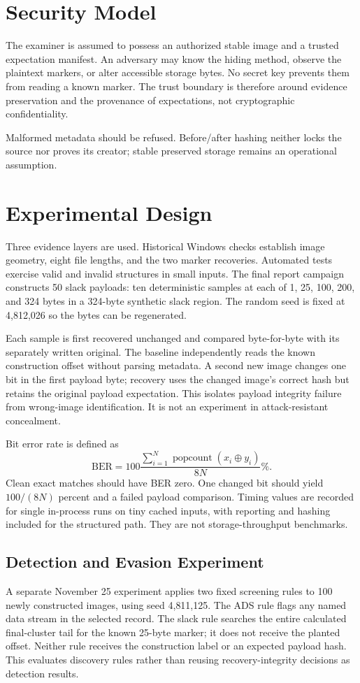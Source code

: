 \section{Security Model}
The examiner is assumed to possess an authorized stable image and a trusted
expectation manifest. An adversary may know the hiding method, observe the
plaintext markers, or alter accessible storage bytes. No secret key prevents
them from reading a known marker. The trust boundary is therefore around
evidence preservation and the provenance of expectations, not cryptographic
confidentiality.

Malformed metadata should be refused. Before/after hashing neither locks
the source nor proves its creator; stable preserved storage remains an
operational assumption.

\section{Experimental Design}
Three evidence layers are used. Historical Windows checks establish image
geometry, eight file lengths, and the two marker recoveries. Automated tests
exercise valid and invalid structures in small inputs. The final report
campaign constructs 50 slack payloads: ten deterministic samples at each
of 1, 25, 100, 200, and 324 bytes in a 324-byte synthetic slack region.
The random seed is fixed at 4,812,026 so the bytes can be regenerated.

Each sample is first recovered unchanged and compared byte-for-byte with
its separately written original. The baseline independently reads the known
construction offset without parsing metadata. A second new image changes
one bit in the first payload byte; recovery uses the changed image's correct
hash but retains the original payload expectation. This isolates payload
integrity failure from wrong-image identification. It is not an experiment
in attack-resistant concealment.

Bit error rate is defined as
\begin{equation}
\mathrm{BER}=100\frac{\sum_{i=1}^{N}\operatorname{popcount}(x_i\oplus y_i)}{8N}\%.
\end{equation}
Clean exact matches should have BER zero. One changed bit should yield
$100/(8N)$ percent and a failed payload comparison. Timing values are
recorded for single in-process runs on tiny cached inputs, with reporting
and hashing included for the structured path. They are not storage-throughput
benchmarks.

\subsection{Detection and Evasion Experiment}
A separate November 25 experiment applies two fixed screening rules to
100 newly constructed images, using seed 4,811,125. The ADS rule flags any
named data stream in the selected record. The slack rule searches the
entire calculated final-cluster tail for the known 25-byte marker; it does
not receive the planted offset. Neither rule receives the construction
label or an expected payload hash. This evaluates discovery rules rather
than reusing recovery-integrity decisions as detection results.

